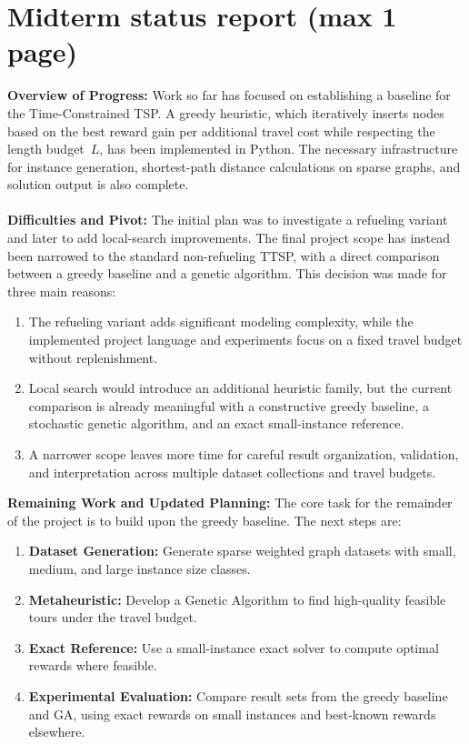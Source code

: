 \documentclass[report,english,cleveref,autoref,a4paper]{lipics-v2021}
\begin{document}
\section{Midterm status report (max 1 page)}
\textbf{Overview of Progress:}
Work so far has focused on establishing a baseline for the Time-Constrained TSP. A greedy heuristic, which iteratively inserts nodes based on the best reward gain per additional travel cost while respecting the length budget~$L$, has been implemented in Python. The necessary infrastructure for instance generation, shortest-path distance calculations on sparse graphs, and solution output is also complete.
\\ \\
\textbf{Difficulties and Pivot:}
The initial plan was to investigate a refueling variant and later to add local-search improvements. The final project scope has instead been narrowed to the standard non-refueling TTSP, with a direct comparison between a greedy baseline and a genetic algorithm. This decision was made for three main reasons:
\begin{enumerate}
    \item The refueling variant adds significant modeling complexity, while the implemented project language and experiments focus on a fixed travel budget without replenishment.
    \item Local search would introduce an additional heuristic family, but the current comparison is already meaningful with a constructive greedy baseline, a stochastic genetic algorithm, and an exact small-instance reference.
    \item A narrower scope leaves more time for careful result organization, validation, and interpretation across multiple dataset collections and travel budgets.
\end{enumerate}

\textbf{Remaining Work and Updated Planning:}
The core task for the remainder of the project is to build upon the greedy baseline. The next steps are:
\begin{enumerate}
    \item \textbf{Dataset Generation:} Generate sparse weighted graph datasets with small, medium, and large instance size classes.
    \item \textbf{Metaheuristic:} Develop a Genetic Algorithm to find high-quality feasible tours under the travel budget.
    \item \textbf{Exact Reference:} Use a small-instance exact solver to compute optimal rewards where feasible.
    \item \textbf{Experimental Evaluation:} Compare result sets from the greedy baseline and GA, using exact rewards on small instances and best-known rewards elsewhere.
\end{enumerate}
\end{document}
